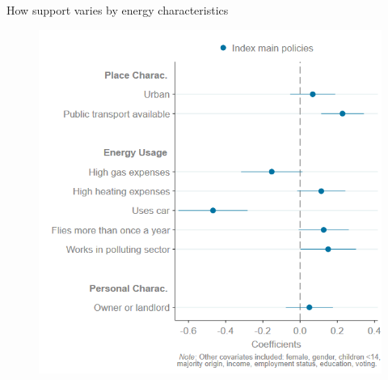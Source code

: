 \begin{framefont}{\small}
\begin{frame}{How support varies by energy characteristics}
\begin{figure}
	\includegraphics[width=.5\paperwidth]{../figures/FR/Coefplot_SetAB_PlotB_index_main_policies.png}
\end{figure}
\end{frame}



\end{framefont}
